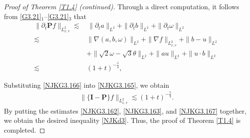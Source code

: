 \documentclass[10pt,a4paper]{amsart}
\begin{document}
\begin{proof}[Proof of Theorem \ref{T1.4} \emph{(}continued\emph{)}]
Through a direct computation, it follows from \eqref{G3.21}$_1$–\eqref{G3.21}$_3$ that  
\begin{align}\label{NJKG3.166}
\|\partial_t{\mathbf{P}f} \|_{L_{x,v}^2}\lesssim&\, \|\partial_t a\|_{L^2}+ 
  \|\partial_t b\|_{L^2} +\|\partial_t \omega\|_{L^2}\nonumber\\
\lesssim\,&\|\nabla (a,b,\omega)\|_{L^2}+\|\nabla f\|_{L_{x,v}^2}+\|b-u\|_{L^2}\nonumber\\
& +\|\sqrt{2}\omega-\sqrt{3}\theta\|_{L^2}+\|au\|_{L^2}+\|u\cdot b\|_{L^2}\nonumber\\
\lesssim\,& (1+t)^{-\frac{5}{4}},
\end{align}

Substituting \eqref{NJKG3.166} into \eqref{NJKG3.165}, we obtain 
\begin{align}\label{NJKG3.167}
 \|\{\mathbf{I}-\mathbf{P}\}f\|_{L_{x,v}^2} \lesssim (1+t)^{-\frac{5}{4}}.   
\end{align}
By putting the estimates \eqref{NJKG3.162}, \eqref{NJKG3.163}, 
and \eqref{NJKG3.167} together, we obtain the desired  inequality \eqref{NJKd3}.
 Thus, the proof of Theorem \ref{T1.4} is completed.  
\end{proof}
\end{document}
